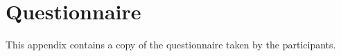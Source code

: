 \chapter{Questionnaire}
\label{questionnaire}
This appendix contains a copy of the questionnaire taken by the participants. 
